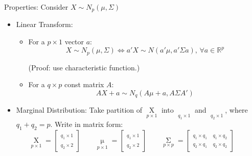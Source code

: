     Properties: Consider $ X\sim N_p(\mu,\Sigma) $
    \begin{itemize}[topsep=6pt,itemsep=4pt]
        \item Linear Transform:
        \begin{itemize}[topsep=6pt,itemsep=4pt]       
        \item For a $ p\times 1 $ vector $ a $:
        \[
            X\sim N_p(\mu,\Sigma )\Leftrightarrow a'X\sim N(a'\mu,a'\Sigma a),\,\forall a\in\mathbb{R}^p 
        \]

        (Proof: use characteristic function.)
        
        \item For a $ q\times p $ const matrix $ A $:
        \[
            AX+a\sim N_q(A\mu+a,A\Sigma  A')
        \]
        \end{itemize}
        \item Marginal Distribution: Take partition of $ \mathop{X}\limits_{p\times 1} $ into $ \mathop{X_1}\limits_{q_1\times 1} $ and $ \mathop{X_2}\limits_{q_2\times 1}  $, where $ q_1+q_2=p $. Write in matrix form:
        \[
            \mathop{X}\limits_{p\times 1}=
            \begin{bmatrix}
                \mathop{X_1}\limits_{q_1\times 1}\\
                \mathop{X_2}\limits_{q_2\times 2}  
            \end{bmatrix}  
            \qquad 
            \mathop{\mu}\limits_{p\times 1}=
            \begin{bmatrix}
                \mathop{\mu_1 }\limits_{q_1\times 1}\\
                \mathop{\mu_2 }\limits_{q_2\times 2}  
            \end{bmatrix}  
            \qquad             
            \mathop{\Sigma }\limits_{p\times p}=
            \begin{bmatrix}
                \mathop{\Sigma_{11} }\limits_{q_1\times q_1}&\mathop{\Sigma_{12} }\limits_{q_1\times q_2} \\
                \mathop{\Sigma_{21} }\limits_{q_2\times q_1}&\mathop{\Sigma_{22} }\limits_{q_2\times q_2}   
            \end{bmatrix}  
            \qquad 
        \]
        

\end{itemize}
